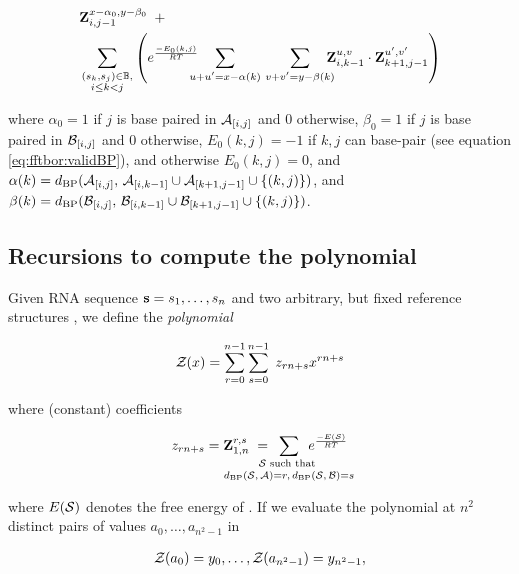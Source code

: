 \begin{align}
\label{eq:ffttwo:bfZabij}
\begin{split}
& \bfZ{x-\alpha_0,y-\beta_0}{i,j-1}\enspace + \\
& \sum_{\substack{(s_k,s_j) \in \bpSet, \\ i \le k<j}}
\left(
\boltzNuss{k,j}\quad
\sum_{\mathclap{u+u'=x-\alpha(k)}}\hspace{3.75em}
\sum_{\mathclap{v+v'=y-\beta(k)}}\quad
\bfZ{u,v}{i,k-1} \cdot \bfZ{u',v'}{k+1,j-1}
\right)
\end{split}
\end{align}

where $\alpha_0 = 1$ if $j$ is base paired in $\mathcal A_{[i,j]}$ and 0 otherwise,
$\beta_0 = 1$ if $j$ is base paired in $\mathcal B_{[i,j]}$ and 0 otherwise,
$E_0(k,j)=-1$ if $k,j$ can base-pair
(see equation \ref{eq:fftbor:validBP}), and otherwise $E_0(k,j)=0$, and
$\alpha(k) =
d_{\text{BP}}(\mathcal A_{[i,j]},\,\mathcal A_{[i,k-1]} \cup \mathcal A_{[k+1,j-1]} \cup \{ (k,j) \})$,
and
$\beta(k) =
d_{\text{BP}}(\mathcal B_{[i,j]},\,\mathcal B_{[i,k-1]} \cup \mathcal B_{[k+1,j-1]} \cup \{ (k,j) \})$.

\subsection{Recursions to compute the polynomial
\texorpdfstring{}{}}
\label{subsec:ffttwo:polynomial}

Given RNA sequence ${\bf s} = s_1,\dots,s_n$
and two arbitrary, but fixed reference
structures \strAB, we define the {\em polynomial}

\begin{align}
\label{eq:ffttwo:zOfX}
\fullZx = \sum_{r=0}^{n-1} \sum_{s=0}^{n-1}\; z_{rn+s} x^{rn+s}
\end{align}

where (constant) coefficients

\begin{align}
z_{rn+s} = \bfZ{r,s}{1,n}\;=
\enspace\sum_{\mathclap{\substack{
\str \text{ such that } \rule[-.5ex]{0pt}{0pt} \\
\dBP{\str}{\strA} = r,\,\dBP{\str}{\strB} = s
}}}\enspace
\boltzF{\str}
\end{align}

where $E(\mathcal S)$ denotes the free energy of \str.
If we evaluate the polynomial \fullZx at $n^2$ distinct pairs of values
$a_0,\dots,a_{n^2-1}$ in

\begin{align}
\label{eq:ffttwo:solutionsForAlpha}
\emZof{}{a_0} = y_{0}, \dots, \emZof{}{a_{n^2-1}} = y_{n^2-1},
\end{align}

